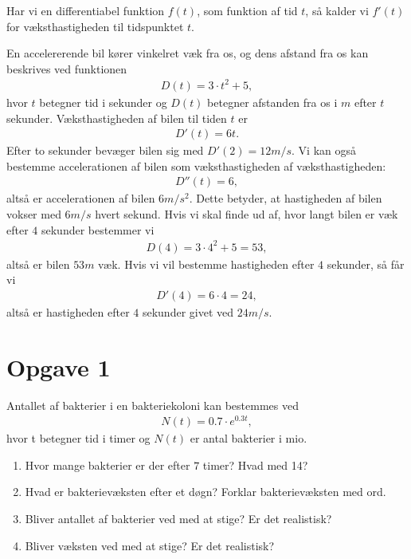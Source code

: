 \begin{defn}
Har vi en differentiabel funktion $f(t)$, som funktion af tid $t$, så kalder vi $f'(t)$ for væksthastigheden til tidspunktet $t$. 
\end{defn}
\begin{exa}
En accelererende bil kører vinkelret væk fra os, og dens afstand fra os kan beskrives ved funktionen \begin{align*}
D(t) = 3\cdot t^2 + 5,
\end{align*}
hvor $t$ betegner tid i sekunder og $D(t)$ betegner afstanden fra os i $m$ efter $t$ sekunder. Væksthastigheden af bilen til tiden $t$ er 
\begin{align*}
D'(t) = 6t.
\end{align*}
Efter to sekunder bevæger bilen sig med $D'(2) = 12 m/s.$ Vi kan også bestemme accelerationen af bilen som væksthastigheden af væksthastigheden:
\begin{align*}
D''(t) = 6,
\end{align*}
altså er accelerationen af bilen $6m/s^2$. Dette betyder, at hastigheden af bilen vokser med $6m/s$ hvert sekund.  
Hvis vi skal finde ud af, hvor langt bilen er væk efter $4$ sekunder bestemmer vi
\begin{align*}
D(4) = 3\cdot 4^2 +5 = 53,
\end{align*}
altså er bilen $53 m$ væk. 
Hvis vi vil bestemme hastigheden efter $4$ sekunder, så får vi 
\begin{align*}
D'(4) = 6\cdot 4 = 24, 
\end{align*}
altså er hastigheden efter $4$ sekunder givet ved $24 m/s$.
\end{exa}
\section*{Opgave 1}
Antallet af bakterier i en bakteriekoloni kan bestemmes ved
\begin{align*}
N(t) = 0.7\cdot e^{0.3t},
\end{align*}
hvor t betegner tid i timer og $N(t)$ er antal bakterier i mio. 
\begin{enumerate}
\item Hvor mange bakterier er der efter $7$ timer? Hvad med 14?
\item Hvad er bakterievæksten efter et døgn? Forklar bakterievæksten med ord.
\item Bliver antallet af bakterier ved med at stige? Er det realistisk? 
\item Bliver væksten ved med at stige? Er det realistisk?
\end{enumerate}
